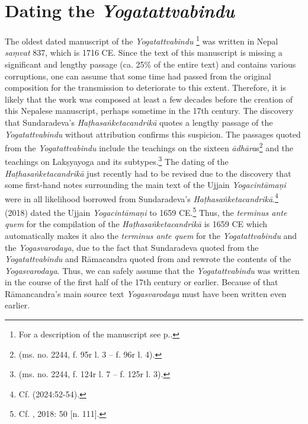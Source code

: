 \section{Dating the \textit{Yogatattvabindu}}
\label{dating}
The oldest dated manuscript of the \textit{Yogatattvabindu} \footnote{For a description of the manuscript see  p.\pageref{n1description}.} was written in Nepal \textit{saṃvat} 837, which is 1716 CE. Since the text of this manuscript is missing a significant and lengthy passage (ca. 25\% of the entire text) and contains various corruptions, one can assume that some time had passed from the original composition for the transmission to deteriorate to this extent. Therefore, it is likely that the work was composed at least a few decades before the creation of this Nepalese manuscript, perhaps sometime in the 17th century. The discovery that Sundaradeva's \textit{Haṭhasaṅketacandrikā} quotes a lengthy passage of the \textit{Yogatattvabindu} without attribution confirms this suspicion. The passages quoted from the \textit{Yogatattvabindu} include the teachings on the sixteen \textit{ādhāra}s\footnote{ (ms. no. 2244, f. 95r l. 3 -- f. 96r l. 4).} and the teachings on Lakṣyayoga and its subtypes.\footnote{ (ms. no. 2244, f. 124r l. 7 -- f. 125r l. 3).} The dating of the \textit{Haṭhasaṅketacandrikā} just recently had to be revised due to the discovery that some first-hand notes surrounding the main text of the Ujjain \textit{Yogacintāmaṇi} were in all likelihood borrowed from Sundaradeva's \textit{Haṭhasaṅketacandrikā}.\footnote{Cf. \citeauthor{birch2024} (2024:52-54).} \citeauthor{birch2018proliferation} (2018) dated the Ujjain \textit{Yogacintāmaṇi} to 1659 CE.\footnote{Cf. \citeauthor{birch2018proliferation}, 2018: 50 [n. 111].} Thus, the \textit{terminus ante quem} for the compilation of the \textit{Haṭhasaṅketacandrikā} is 1659 CE which automatically makes it also the \textit{terminus ante quem} for the \textit{Yogatattvabindu} and the \textit{Yogasvarodaya}, due to the fact that Sundaradeva quoted from the \textit{Yogatattvabindu} and Rāmacandra quoted from and rewrote the contents of the \textit{Yogasvarodaya}. Thus, we can safely assume that the \textit{Yogatattvabindu} was written in the course of the first half of the 17th century or earlier. Because of that Rāmancandra's main source text \textit{Yogasvarodaya} must have been written even earlier.

